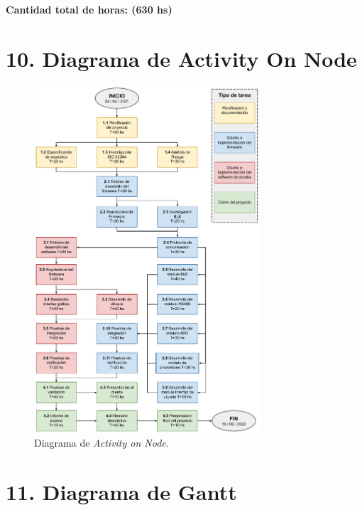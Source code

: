 \documentclass[
11pt, %
codirector, %
]{charter}
\begin{document}
\textbf{Cantidad total de horas: (630 hs)}

\newpage
\section{10. Diagrama de Activity On Node}
\label{sec:AoN}

\begin{figure}[htpb]
\centering 
\includegraphics[width=0.75\textwidth]{./Figuras/DASNActivityonNode.pdf}
\caption{Diagrama de \textit{Activity on Node.}}
\label{fig:AoN}
\end{figure}


\section{11. Diagrama de Gantt}
\label{sec:gantt}
\end{document}
